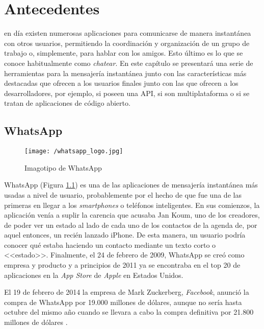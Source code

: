 \chapter{Antecedentes}
\label{chap:antecedentes}

 en día existen numerosas aplicaciones para comunicarse de manera instantánea con otros usuarios, permitiendo la coordinación y organización de un grupo de trabajo o, simplemente, para hablar con los amigos. Esto último es lo que se conoce habitualmente como \textit{chatear}. En este capítulo se presentará una serie de herramientas para la mensajería instantánea junto con las características más destacadas que ofrecen a los usuarios finales junto con las que ofrecen a los desarrolladores, por ejemplo, si poseen una \acf{API}, si son multiplataforma o si se tratan de aplicaciones de código abierto.

\section{WhatsApp}
\label{sec:whatsapp}

\begin{figure}
	\begin{center}
		\texttt{[image: /whatsapp\_logo.jpg]}
		\caption{Imagotipo de WhatsApp}
		\label{fig:whatsapp}
	\end{center}
\end{figure}

WhatsApp (Figura \ref{fig:whatsapp}) es una de las aplicaciones de mensajería instantánea más usadas a nivel de usuario, probablemente por el hecho de que fue una de las primeras en llegar a los \textit{smartphones} o teléfonos inteligentes. En sus comienzos, la aplicación venía a suplir la carencia que acusaba Jan Koum, uno de los creadores, de poder ver un estado al lado de cada uno de los contactos de la agenda de, por aquel entonces, un recién lanzado iPhone. De esta manera, un usuario podría conocer qué estaba haciendo un contacto mediante un texto corto o <<estado>>. Finalmente, el 24 de febrero de 2009, WhatsApp se creó como empresa y producto y a principios de 2011 ya se encontraba en el top 20 de aplicaciones en la \textit{App Store} de \textit{Apple} en Estados Unidos.

\newpage

El 19 de febrero de 2014 la empresa de Mark Zuckerberg, \textit{Facebook}, anunció la compra de WhatsApp por 19.000 millones de dólares, aunque no sería hasta octubre del mismo año cuando se llevara a cabo la compra definitiva por 21.800 millones de dólares \cite{Novoa2014}.

